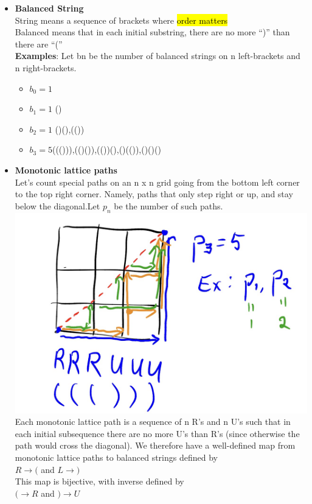 \documentclass{article}
\begin{document}
\begin{itemize}
================================================================================================================
\newpage
================================================================================================================

\item \textbf{Balanced String}\\
String means a sequence of brackets where \hl{order matters}\\
Balanced means that in each initial substring, there are no more “)”
than there are “(”\\
\textbf{Examples}: Let bn be the number of balanced strings on n left-brackets and n
right-brackets.
\begin{itemize}
\item $b_0= 1 $ 
\item $b_1= 1 $ ()
\item $b_2= 1 $ ()(),(())
\item $b_3= 5 $((())),(()()),(())(),()(()),()()() 
\end{itemize}


\item \textbf{Monotonic lattice paths}\\
Let’s count special paths on an n x n grid going from the bottom left
corner to the top right corner. Namely, paths that only step right or up,
and stay below the diagonal.Let $p_n$ be the number of such paths.
  \includegraphics[width=1.0\linewidth]{graph/8.jpg} \\
  
Each monotonic lattice path is a sequence of n R’s and n U’s such that in
each initial subsequence there are no more U’s than R’s (since otherwise
the path would cross the diagonal).
We therefore have a well-defined map from monotonic lattice paths to
balanced strings defined by\\
$R \rightarrow ( $ and $L \rightarrow )$\\
This map is bijective, with inverse defined by\\
$( \rightarrow R$ and $) \rightarrow U$


\end{itemize}
\end{document}
